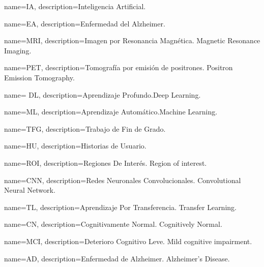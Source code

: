 { name=IA, description={Inteligencia Artificial.}}

{ name=EA, description={Enfermedad del Alzheimer.}}

{ name=MRI, description={Imagen por Resonancia Magnética. Magnetic Resonance Imaging.}}

{ name=PET, description={Tomografía por emisión de positrones. Positron Emission Tomography.}}

{ name= DL, description={Aprendizaje Profundo.Deep Learning.}}

{ name=ML, description={Aprendizaje Automático.Machine Learning.}}

{ name=TFG, description={Trabajo de Fin de Grado.}}

{ name=HU, description={Historias de Usuario.}}

{ name=ROI, description={Regiones De Interés. Region of interest.}}

{ name=CNN, description={Redes Neuronales Convolucionales. Convolutional Neural Network.}}

{ name=TL, description={Aprendizaje Por Transferencia. Transfer Learning.}}

{ name=CN, description={Cognitivamente Normal. Cognitively Normal.}}

{ name=MCI, description={Deterioro Cognitivo Leve. Mild cognitive impairment.}}

{ name=AD, description={Enfermedad de Alzheimer. Alzheimer's Disease.}}
